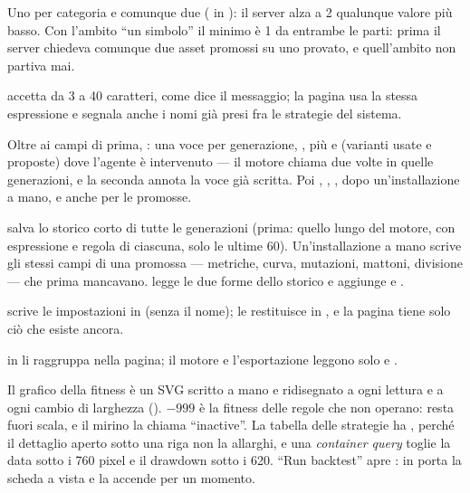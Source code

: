 \begin{description}[leftmargin = 1.4em, style = nextline, itemsep = 4pt]
  \item[Il minimo degli asset] Uno per categoria e comunque due
    ( in ): il server alza a 2
    qualunque valore più basso. Con l'ambito \enquote{un simbolo} il minimo è
    1 da entrambe le parti: prima il server chiedeva comunque due asset
    promossi su uno provato, e quell'ambito non partiva mai.
  \item[Il nome]  accetta da 3 a 40 caratteri, come dice il
    messaggio; la pagina usa la stessa espressione e segnala anche i nomi già
    presi fra le strategie del sistema.
  \item[Il lavoro] Oltre ai campi di prima, : una voce per
    generazione, , più  e  (varianti usate
    e proposte) dove l'agente è intervenuto --- il motore chiama
     due volte in quelle generazioni, e la seconda annota la
    voce già scritta. Poi , , ,
     dopo un'installazione a mano, e  anche
    per le promosse.
  \item[I metadati]  salva lo storico corto di tutte le
    generazioni (prima: quello lungo del motore, con espressione e regola di
    ciascuna, solo le ultime 60). Un'installazione a mano scrive gli stessi
    campi di una promossa --- metriche, curva, mutazioni, mattoni,
    divisione --- che prima mancavano. 
    legge le due forme dello storico e aggiunge  e
    .
  \item[L'ultimo avvio]  scrive le impostazioni
    in  (senza il nome);
     le restituisce in , e la
    pagina tiene solo ciò che esiste ancora.
  \item[I mattoni]  in 
    li raggruppa nella pagina; il motore e l'esportazione leggono solo
     e .
\end{description}

\noindent
Il grafico della fitness è un SVG scritto a mano e ridisegnato a ogni lettura
e a ogni cambio di larghezza (). $-999$ è la fitness delle
regole che non operano: resta fuori scala, e il mirino la chiama
\enquote{inactive}. La tabella delle strategie ha ,
perché il dettaglio aperto sotto una riga non la allarghi, e una
\emph{container query} toglie la data sotto i \num{760} pixel e il drawdown
sotto i \num{620}. \enquote{Run backtest} apre :
 in  porta la scheda a vista e la
accende per un momento.

